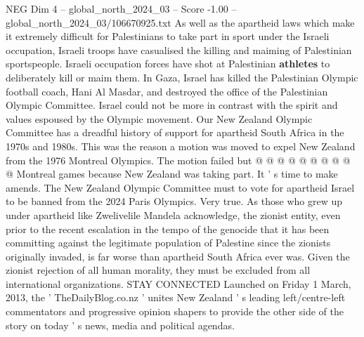 \begin{textsample}{NEG Dim 4 – global\_north\_2024\_03 – Score -1.00 – global\_north\_2024\_03/106670925.txt}
As well as the apartheid laws which make it extremely difficult for Palestinians to take part in sport under the Israeli occupation, Israeli troops have casualised the killing and maiming of Palestinian sportspeople.
Israeli occupation forces have shot at Palestinian \textbf{athletes} to deliberately kill or maim them.
In Gaza, Israel has killed the Palestinian Olympic football coach, Hani Al Masdar, and destroyed the office of the Palestinian Olympic Committee.
Israel could not be more in contrast with the spirit and values espoused by the Olympic movement.
Our New Zealand Olympic Committee has a dreadful history of support for apartheid South Africa in the 1970s and 1980s.
This was the reason a motion was moved to expel New Zealand from the 1976 Montreal Olympics.
The motion failed but @ @ @ @ @ @ @ @ @ @ Montreal games because New Zealand was taking part.
It ' s time to make amends.
The New Zealand Olympic Committee must to vote for apartheid Israel to be banned from the 2024 Paris Olympics.
Very true.
As those who grew up under apartheid like Zwelivelile Mandela acknowledge, the zionist entity, even prior to the recent escalation in the tempo of the genocide that it has been committing against the legitimate population of Palestine since the zionists originally invaded, is far worse than apartheid South Africa ever was.
Given the zionist rejection of all human morality, they must be excluded from all international organizations.
STAY CONNECTED Launched on Friday 1 March, 2013, the ' TheDailyBlog.co.nz ' unites New Zealand ' s leading left/centre-left commentators and progressive opinion shapers to provide the other side of the story on today ' s news, media and political agendas.

\end{textsample}
